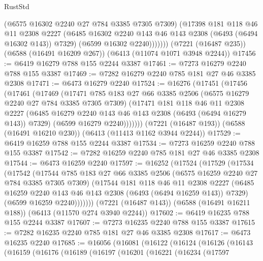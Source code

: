 \begin{lexlean}{RustStd}
\begin{coremodule}
              (@6575 @16302 @2240 @27 @784 @3385 @7305 @7309)
              (@17398
                @181
                @118
                @46
                @11
                @2308
                @2227
                (@6485 @16302 @2240 @143 @46 @143 @2308 (@6493 (@6494 @16302 @143)) @7329)
                (@6599 @16302 @2240)))))))
    (@7221 (@16487 @235))
    (@6588 (@16491 @16209 @267))
    (@6413 (@11074 @1071 @3948 @2244))
@17456 := @6419 @16279 @788 @155 @2244 @3387
@17461 := @7273 @16279 @2240 @788 @155 @3387
@17469 := @7282 @16279 @2240 @785 @181 @27 @46 @3385 @2308
@17471 := @6473 @16279 @2240
@17524 := @16276
    (@17451
      (@17456
        (@17461
          (@17469
            (@17471
              @785
              @183
              @27
              @66
              @3385
              @2506
              (@6575 @16279 @2240 @27 @784 @3385 @7305 @7309)
              (@17471
                @181
                @118
                @46
                @11
                @2308
                @2227
                (@6485 @16279 @2240 @143 @46 @143 @2308 (@6493 (@6494 @16279 @143)) @7329)
                (@6599 @16279 @2240)))))))
    (@7221 (@16487 @193))
    (@6588 (@16491 @16210 @230))
    (@6413 (@11413 @1162 @3944 @2244))
@17529 := @6419 @16259 @788 @155 @2244 @3387
@17534 := @7273 @16259 @2240 @788 @155 @3387
@17542 := @7282 @16259 @2240 @785 @181 @27 @46 @3385 @2308
@17544 := @6473 @16259 @2240
@17597 := @16252
    (@17524
      (@17529
        (@17534
          (@17542
            (@17544
              @785
              @183
              @27
              @66
              @3385
              @2506
              (@6575 @16259 @2240 @27 @784 @3385 @7305 @7309)
              (@17544
                @181
                @118
                @46
                @11
                @2308
                @2227
                (@6485 @16259 @2240 @143 @46 @143 @2308 (@6493 (@6494 @16259 @143)) @7329)
                (@6599 @16259 @2240)))))))
    (@7221 (@16487 @143))
    (@6588 (@16491 @16211 @188))
    (@6413 (@11570 @274 @3940 @2244))
@17602 := @6419 @16235 @788 @155 @2244 @3387
@17607 := @7273 @16235 @2240 @788 @155 @3387
@17615 := @7282 @16235 @2240 @785 @181 @27 @46 @3385 @2308
@17617 := @6473 @16235 @2240
@17685 := @16056
    (@16081
      (@16122
        (@16124
          (@16126
            (@16143
              (@16159
                (@16176
                  (@16189
                    (@16197
                      (@16201
                        (@16221
                          (@16234
                            (@17597

\end{coremodule}
\end{lexlean}
